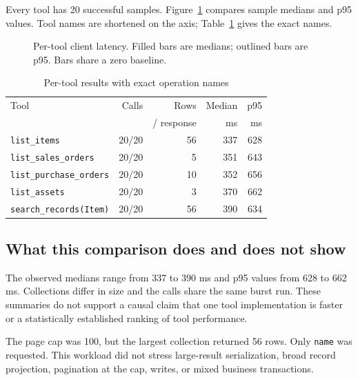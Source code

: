 Every tool has 20 successful samples. Figure~\ref{fig:tools} compares sample medians and p95 values. Tool names are shortened on the axis; Table~\ref{tab:tools} gives the exact names.

\begin{figure}[h]\centering\caption{Per-tool client latency. Filled bars are medians; outlined bars are p95. Bars share a zero baseline.}\label{fig:tools}\end{figure}

\begin{table}[h]\caption{Per-tool results with exact operation names}\label{tab:tools}\EvidenceTableStart
\begin{tabularx}{\linewidth}{@{}Xrrrr@{}}\toprule
Tool & Calls & Rows & Median & p95\\
 & & / response & ms & ms\\\midrule
\texttt{list\_items} & 20/20 & 56 & 337 & 628\\
\texttt{list\_sales\_orders} & 20/20 & 5 & 351 & 643\\
\texttt{list\_purchase\_orders} & 20/20 & 10 & 352 & 656\\
\texttt{list\_assets} & 20/20 & 3 & 370 & 662\\
\texttt{search\_records(Item)} & 20/20 & 56 & 390 & 634\\\bottomrule
\end{tabularx}\end{table}

\subsection*{What this comparison does and does not show}
The observed medians range from 337 to 390 ms and p95 values from 628 to 662 ms. Collections differ in size and the calls share the same burst run. These summaries do not support a causal claim that one tool implementation is faster or a statistically established ranking of tool performance.

The page cap was 100, but the largest collection returned 56 rows. Only \texttt{name} was requested. This workload did not stress large-result serialization, broad record projection, pagination at the cap, writes, or mixed business transactions.

